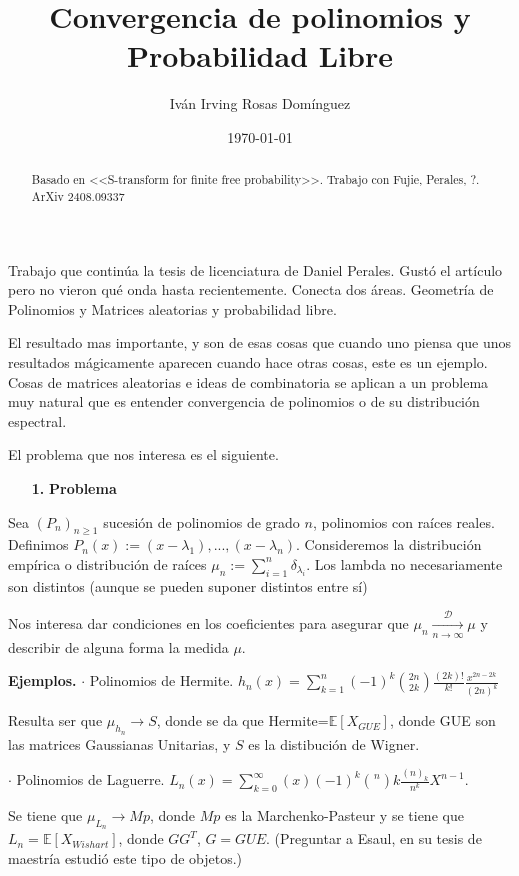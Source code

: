 \documentclass[letterpaper]{article}
\title{\textbf{Convergencia de polinomios y Probabilidad Libre}}
\author{Iván Irving Rosas Domínguez}
\date{\today}
\renewcommand{\to}{\rightarrow}
\newcommand{\E}{\mathbb{E}}
\newcommand{\1}{\mathds{1}}
\theoremstyle{definition}
\theoremstyle{definition}
\theoremstyle{definition}
\theoremstyle{definition}
\theoremstyle{definition}
\begin{document}
\maketitle

\begin{abstract}
Basado en <<S-transform for finite free probability>>. Trabajo con Fujie, Perales, ?.
ArXiv 2408.09337
\end{abstract}
Trabajo que continúa la tesis de licenciatura de Daniel Perales. Gustó el artículo pero no vieron qué onda hasta recientemente. Conecta dos áreas. Geometría de Polinomios y Matrices aleatorias y probabilidad libre.

El resultado mas importante, y son de esas cosas que cuando uno piensa que unos resultados mágicamente aparecen cuando hace otras cosas, este es un ejemplo. Cosas de matrices aleatorias e ideas de combinatoria se aplican a un problema muy natural que es entender convergencia de polinomios o de su distribución espectral.

El problema que nos interesa es el siguiente.

\begin{enumerate}
    \item[\textbf{1.}] \textbf{Problema}
\end{enumerate}
Sea $(P_n)_{n\geq1}$ sucesión de polinomios de grado $n$, polinomios con raíces reales.
Definimos $P_n(x):=(x-\lambda_1),...,(x-\lambda_n)$. Consideremos la distribución empírica o distribución de raíces $\mu_n:=\sum_{i=1}^n\delta_{\lambda_i}$. Los lambda no necesariamente son distintos (aunque se pueden suponer distintos entre sí)

Nos interesa dar condiciones en los coeficientes para asegurar que $\mu_n\xrightarrow[n\to \infty]{\mathcal{D}}\mu$ y describir de alguna forma la medida $\mu$. 

\textbf{Ejemplos.}
$\cdot$ Polinomios de Hermite. $h_n(x)=\sum_{k=1}^{n}(-1)^k {2n\choose2k} \frac{(2k)!}{k!}\frac{x^{2n-2k}}{(2n)^k}$

Resulta ser que $\mu_{h_n}\to S$, donde se da que Hermite=$\E\left[X_{GUE}\right]$, donde GUE son las matrices Gaussianas Unitarias, y $S$ es la distibución de Wigner.

$\cdot$ Polinomios de Laguerre. $L_n(x)=\sum_{k=0}^{\infty}(x)(-1)^k {n\choose} k\frac{(n)_k}{n^k}X^{n-1}$.

Se tiene que $\mu_{L_n}\to Mp$, donde $Mp$ es la Marchenko-Pasteur y se tiene que $L_n=\E\left[X_{Wishart}\right]$, donde $GG^{T}$, $G=GUE$. (Preguntar a Esaul, en su tesis de maestría estudió este tipo de objetos.)
\end{document}
